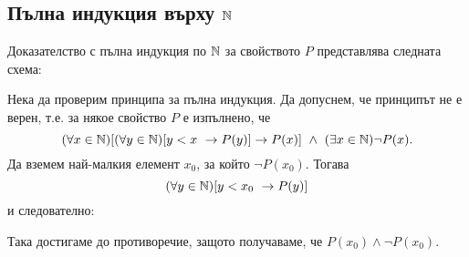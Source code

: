 \newpage 
\subsection*{Пълна индукция върху $\Nat$}

Доказателство с пълна индукция по $\Nat$ за свойството $P$ представлява следната схема:
\begin{prooftree}
\end{prooftree}
Нека да проверим принципа за пълна индукция.
Да допуснем, че принципът не е верен, т.е. за някое свойство $P$ е изпълнено, че
\[(\forall x\in\Nat)[(\forall y\in \Nat)[y < x\ \rightarrow P(y)]\rightarrow P(x)]\ \wedge\ (\exists x\in\Nat) \neg P(x).\]
Да вземем най-малкия елемент $x_0$, за който $\neg P(x_0)$.
Тогава \[(\forall y\in \Nat)[y < x_0\ \rightarrow P(y)]\]
и следователно:
\begin{prooftree}
\end{prooftree}
Така достигаме до противоречие, защото получаваме, че $P(x_0)\wedge \neg P(x_0)$.
    
